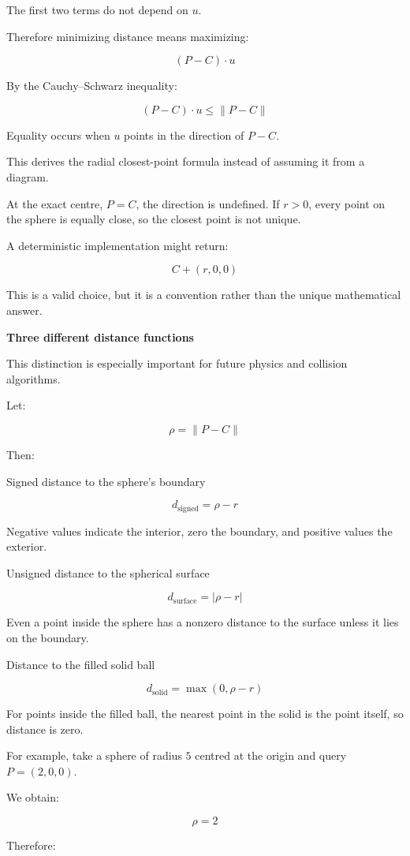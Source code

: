 The first two terms do not depend on \(u\).

Therefore minimizing distance means maximizing:

\[
(P-C)\cdot u
\]

By the Cauchy--Schwarz inequality:

\[
(P-C)\cdot u\le\|P-C\|
\]

Equality occurs when \(u\) points in the direction of \(P-C\).

This derives the radial closest-point formula instead of assuming it from a diagram.

At the exact centre, \(P=C\), the direction is undefined. If \(r>0\), every point on the sphere is equally close, so the closest point is not unique.

A deterministic implementation might return:

\[
C+(r,0,0)
\]

This is a valid choice, but it is a convention rather than the unique mathematical answer.

\textbf{Three different distance functions}

This distinction is especially important for future physics and collision algorithms.

Let:

\[
\rho=\|P-C\|
\]

Then:

Signed distance to the sphere's boundary

\[
\boxed{d_{\mathrm{signed}}=\rho-r}
\]

Negative values indicate the interior, zero the boundary, and positive values the exterior.

Unsigned distance to the spherical surface

\[
\boxed{d_{\mathrm{surface}}=|\rho-r|}
\]

Even a point inside the sphere has a nonzero distance to the surface unless it lies on the boundary.

Distance to the filled solid ball

\[
\boxed{d_{\mathrm{solid}}=\max(0,\rho-r)}
\]

For points inside the filled ball, the nearest point in the solid is the point itself, so distance is zero.

For example, take a sphere of radius \(5\) centred at the origin and query \(P=(2,0,0)\).

We obtain:

\[
\rho=2
\]

Therefore:

